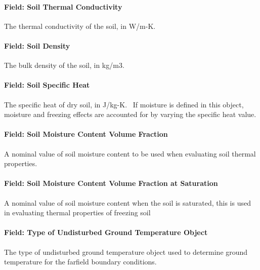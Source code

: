 \paragraph{Field: Soil Thermal Conductivity}\label{field-soil-thermal-conductivity-001}

The thermal conductivity of the soil, in W/m-K.

\paragraph{Field: Soil Density}\label{field-soil-density-001}

The bulk density of the soil, in kg/m3.

\paragraph{Field: Soil Specific Heat}\label{field-soil-specific-heat-001}

The specific heat of dry soil, in J/kg-K.~ If moisture is defined in this object, moisture and freezing effects are accounted for by varying the specific heat value.

\paragraph{Field: Soil Moisture Content Volume Fraction}\label{field-soil-moisture-content-volume-fraction-000}

A nominal value of soil moisture content to be used when evaluating soil thermal properties.

\paragraph{Field: Soil Moisture Content Volume Fraction at Saturation}\label{field-soil-moisture-content-volume-fraction-at-saturation-000}

A nominal value of soil moisture content when the soil is saturated, this is used in evaluating thermal properties of freezing soil

\paragraph{Field: Type of Undisturbed Ground Temperature Object}\label{field-type-of-undisturbed-ground-temperature-object-1-001}

The type of undisturbed ground temperature object used to determine ground temperature for the farfield boundary conditions.

